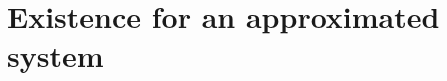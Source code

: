 \documentclass[11pt]{article}
\newcommand{\dd}{\mathrm{d}}
\newtheorem{lem}[tw]{Lemma}
\numberwithin{equation}{section}
\numberwithin{tw}{section}
\begin{document}


\section{Existence for an approximated system}\label{existence_sect}
\end{document}

